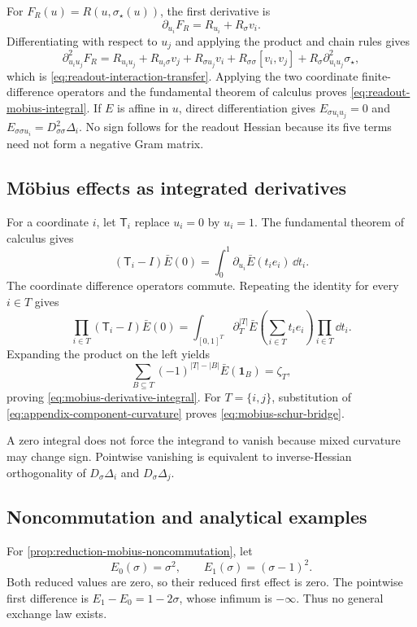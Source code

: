 For $F_R(u)=R(u,\sigma_\star(u))$, the first derivative is
\[
\partial_{u_i}F_R=R_{u_i}+R_\sigma v_i.
\]
Differentiating with respect to $u_j$ and applying the product and chain rules
gives
\[
\partial^2_{u_i u_j}F_R
=R_{u_i u_j}+R_{u_i\sigma}v_j+R_{\sigma u_j}v_i
+R_{\sigma\sigma}[v_i,v_j]
+R_\sigma\partial^2_{u_i u_j}\sigma_\star,
\]
which is \cref{eq:readout-interaction-transfer}.  Applying the two coordinate
finite-difference operators and the fundamental theorem of calculus proves
\cref{eq:readout-mobius-integral}.  If $E$ is affine in $u$, direct
differentiation gives $E_{\sigma u_i u_j}=0$ and
$E_{\sigma\sigma u_i}=D^2_{\sigma\sigma}\Delta_i$.  No sign follows for the
readout Hessian because its five terms need not form a negative Gram matrix.

\subsection{M\"obius effects as integrated derivatives}

For a coordinate $i$, let $\mathsf T_i$ replace $u_i=0$ by $u_i=1$.  The fundamental theorem of calculus gives
\[
(\mathsf T_i-I)\bar E(0)
=\int_0^1\partial_{u_i}\bar E(t_ie_i)\,\dd t_i.
\]
The coordinate difference operators commute.  Repeating the identity for every $i\in T$ gives
\[
\prod_{i\in T}(\mathsf T_i-I)\bar E(0)
=\int_{[0,1]^T}
\partial_T^{|T|}\bar E\left(\sum_{i\in T}t_ie_i\right)
\prod_{i\in T}\dd t_i.
\]
Expanding the product on the left yields
\[
\sum_{B\subseteq T}(-1)^{|T|-|B|}\bar E(\mathbf1_B)=\zeta_T,
\]
proving \cref{eq:mobius-derivative-integral}.  For $T=\{i,j\}$, substitution of \cref{eq:appendix-component-curvature} proves \cref{eq:mobius-schur-bridge}.

A zero integral does not force the integrand to vanish because mixed curvature may change sign.  Pointwise vanishing is equivalent to inverse-Hessian orthogonality of $D_\sigma\Delta_i$ and $D_\sigma\Delta_j$.

\subsection{Noncommutation and analytical examples}

For \cref{prop:reduction-mobius-noncommutation}, let
\[
E_0(\sigma)=\sigma^2,
\qquad
E_1(\sigma)=(\sigma-1)^2.
\]
Both reduced values are zero, so their reduced first effect is zero.  The pointwise first difference is $E_1-E_0=1-2\sigma$, whose infimum is $-\infty$.  Thus no general exchange law exists.

